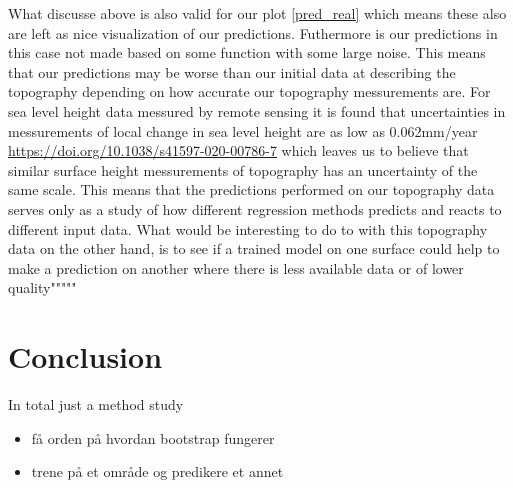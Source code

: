 \documentclass[12pt]{article}
\begin{document}
What discusse above is also valid for our plot \ref{pred_real} which means these also are left as nice visualization of our predictions. Futhermore is our predictions in this case not made based on some function with some large noise. This means that our predictions may be worse than our initial data at describing the topography depending on how accurate our topography messurements are. For sea level height data messured by remote sensing it is found that uncertainties in messurements of local change in sea level height are as low as 0.062mm/year \url{https://doi.org/10.1038/s41597-020-00786-7} which leaves us to believe that similar surface height messurements of topography has an uncertainty of the same scale. This means that the predictions performed on our topography data serves only as a study of how different regression methods predicts and reacts to different input data. What would be interesting to do to with this topography data on the other hand, is to see if a trained model on one surface could help to make a prediction on another where there is less available data or of lower quality"""""

\section{Conclusion}
In total just a method study
\begin{itemize}
  \item få orden på hvordan bootstrap fungerer
  \item trene på et område og predikere et annet
\end{itemize}
\section{}
\end{document}
